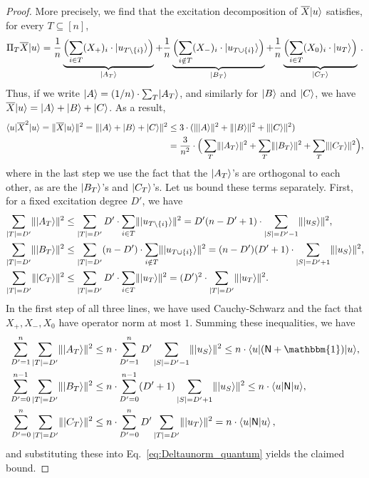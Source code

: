 \documentclass[10pt]{article}
\DeclarePairedDelimiter{\bra}{\langle}{\rvert}%
\DeclarePairedDelimiter{\ket}{\lvert}{\rangle}%
\DeclarePairedDelimiter\norm{\lVert}{\rVert}
\newcommand{\Id}{\mathbbm{1}}
\newcommand{\lift}[1]{\overline{#1}}
\begin{document}
\begin{proof}
    More precisely, we find that the excitation decomposition of $\lift{X} \ket{u}$ satisfies, for every $T\subseteq[n]$,
    \begin{equation}
        \Pi_T\lift{X}\ket{u}=\frac{1}{n}\underbrace{\Bigl(\sum_{i\in T}(X_+)_i\cdot \ket{u_{T\setminus\{i\}}}\Bigr)}_{\ket{A_T}}+\frac{1}{n}\underbrace{\Bigl(\sum_{i\notin T}(X_-)_i\cdot \ket{u_{T\cup\{i\}}}\Bigr)}_{\ket{B_T}}+\frac{1}{n}\underbrace{\Bigl(\sum_{i\in T}(X_0)_i\cdot \ket{u_T}\Bigr)}_{\ket{C_T}}\,. \label{eq:ABC_quantum}
    \end{equation}
    Thus, if we write $\ket{A} = (1/n) \cdot \sum_T \ket{A_T}$, and similarly for $\ket{B}$ and $\ket{C}$, we have
    $\lift{X} \ket{u} = \ket{A} + \ket{B} + \ket{C}$.
    As a result,
    \begin{align}
        \bra{u} \lift{X}^2\ket{u}
        = \norm{\lift{X} \ket{u}}^2
        = \norm{\ket{A} + \ket{B} + \ket{C}}^2
        &\leq 3 \cdot (\norm{\ket{A}}^2 + \norm{\ket{B}}^2 + \norm{\ket{C}}^2)\nonumber\\
        &=\frac{3}{n^2} \cdot \Big(\sum_T \norm{\ket{A_T}}^2+\sum_T \norm{\ket{B_T}}^2+\sum_T \norm{\ket{C_T}}^2\Big),\label{eq:Deltaunorm_quantum}
    \end{align}
    where in the last step we use the fact that the $\ket{A_T}$'s are orthogonal to each other, as are the $\ket{B_T}$'s and $\ket{C_T}$'s.
    Let us bound these terms separately. First, for a fixed excitation degree $D'$, we have
    \begin{align*}
    \sum_{|T|=D'}\norm{\ket{A_T}}^2&\le\sum_{|T|=D'}D'\cdot \sum_{i\in T}\norm{\ket{u_{T\setminus\{i\}}}}^2=D'(n-D'+1)\cdot \sum_{|S|=D'-1}\norm{\ket{u_S}}^2, \\
    \sum_{|T|=D'}\norm{\ket{B_T}}^2&\le\sum_{|T|=D'}(n-D')\cdot \sum_{i\notin T}\norm{\ket{u_{T\cup\{i\}}}}^2=(n-D')(D'+1)\cdot \sum_{|S|=D'+1}\norm{\ket{u_S}}^2, \\
    \sum_{|T|=D'}\norm{\ket{C_T}}^2&\le\sum_{|T|=D'}D'\cdot \sum_{i\in T}\norm{\ket{u_T}}^2=(D')^2\cdot \sum_{|T|=D'}\norm{\ket{u_T}}^2.
    \end{align*}
    In the first step of all three lines, we have used Cauchy-Schwarz and the fact that $X_+, X_-, X_0$ have operator norm at most $1$.
    Summing these inequalities, we have
    \begin{align}
        \sum^n_{D'=1} \sum_{|T| = D'}\norm{\ket{A_T}}^2 &\le n\cdot \sum^n_{D'=1} D' \sum_{|S| = D'-1} \norm{\ket{u_S}}^2 \leq n\cdot \bra{u}(\mathsf{N} + \Id)\ket{u},\\
        \sum^{n-1}_{D'=0} \sum_{|T| = D'}\norm{\ket{B_T}}^2 &\le n\cdot \sum^{n-1}_{D'=0} (D'+1)\sum_{|S| = D'+1} \norm{\ket{u_S}}^2 \le n\cdot \bra{u}\mathsf{N}\ket{u},\\
        \sum^n_{D'=0} \sum_{|T| = D'}\norm{\ket{C_T}}^2 &\le n\cdot \sum^n_{D'=0} D'\sum_{|T| = D'} \norm{\ket{u_T}}^2 = n\cdot \bra{u}\mathsf{N}\ket{u} \,,
    \end{align}
    and substituting these into Eq.~\eqref{eq:Deltaunorm_quantum} yields the claimed bound.
\end{proof}
\end{document}
